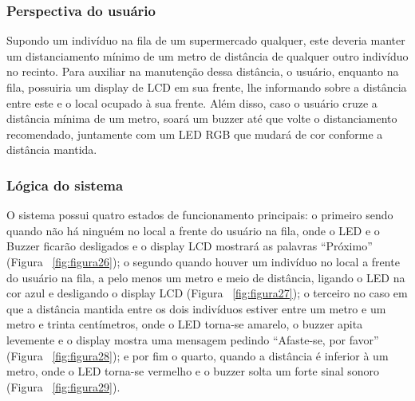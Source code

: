 \documentclass[10pt,twocolumn,letterpaper]{article}
\begin{document}
\subsubsection{Perspectiva do usuário}

Supondo um indivíduo na fila de um supermercado qualquer, este deveria manter um distanciamento mínimo de um metro de distância de qualquer outro indivíduo no recinto. Para auxiliar na manutenção dessa distância, o usuário, enquanto na fila, possuiria um display de LCD em sua frente, lhe informando sobre a distância entre este e o local ocupado à sua frente. Além disso, caso o usuário cruze a distância mínima de um metro, soará um buzzer até que volte o distanciamento recomendado, juntamente com um LED RGB que mudará de cor conforme a distância mantida. 

\subsubsection{Lógica do sistema}

O sistema possui quatro estados de funcionamento principais: o primeiro sendo quando não há ninguém no local a frente do usuário na fila, onde o LED e o Buzzer ficarão desligados e o display LCD mostrará as palavras “Próximo” (Figura ~\ref{fig:figura26}); o segundo quando houver um indivíduo no local a frente do usuário na fila, a pelo menos um metro e meio de distância, ligando o LED na cor azul e desligando o display LCD (Figura ~\ref{fig:figura27}); o terceiro no caso em que a distância mantida entre os dois indivíduos estiver entre um metro e um metro e trinta centímetros, onde o LED torna-se amarelo, o buzzer apita levemente e o display mostra uma mensagem pedindo “Afaste-se, por favor” (Figura ~\ref{fig:figura28}); e por fim o quarto, quando a distância é inferior à um metro, onde o LED torna-se vermelho e o buzzer solta um forte sinal sonoro (Figura ~\ref{fig:figura29}). 
\end{document}
